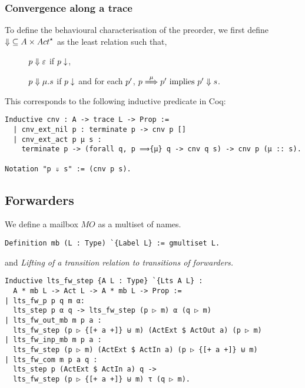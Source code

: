 \subsubsection{Convergence along a trace}

To define the behavioural characterisation of the preorder, we first define
${\cnvalong} \subseteq \States \times \Actfin$ as the least relation such
that,%
\begin{description}
\item[\cnvepsilon] $p \mathrel{\Downarrow} \varepsilon$ if $p \downarrow$,
\item[\cnvmu] $ p \mathrel{\Downarrow} \mu.s $ if $p \downarrow$ and for each $p'$,
$p \mathrel{\overset{\mu} \Longrightarrow} p' \text{ implies } p' \mathrel{\Downarrow} s$.
\end{description}

\noindent
This corresponds to the following inductive predicate in Coq:

\begin{mdframed}
\begin{verbatim}
Inductive cnv : A -> trace L -> Prop :=
  | cnv_ext_nil p : terminate p -> cnv p []
  | cnv_ext_act p μ s :
    terminate p -> (forall q, p ⟹{μ} q -> cnv q s) -> cnv p (μ :: s).

Notation "p ⇓ s" := (cnv p s).
\end{verbatim}
\end{mdframed}


\subsection{Forwarders}

We define a mailbox $MO$ as a multiset of names.

\begin{mdframed}
\begin{verbatim}
Definition mb (L : Type) `{Label L} := gmultiset L.
\end{verbatim}
\end{mdframed}

\noindent
{} and \emph{
Lifting of a transition relation to transitions of forwarders.
}

\begin{mdframed}
\begin{verbatim}
Inductive lts_fw_step {A L : Type} `{Lts A L} :
  A * mb L -> Act L -> A * mb L -> Prop :=
| lts_fw_p p q m α:
  lts_step p α q -> lts_fw_step (p ▷ m) α (q ▷ m)
| lts_fw_out_mb m p a :
  lts_fw_step (p ▷ {[+ a +]} ⊎ m) (ActExt $ ActOut a) (p ▷ m)
| lts_fw_inp_mb m p a :
  lts_fw_step (p ▷ m) (ActExt $ ActIn a) (p ▷ {[+ a +]} ⊎ m)
| lts_fw_com m p a q :
  lts_step p (ActExt $ ActIn a) q ->
  lts_fw_step (p ▷ {[+ a +]} ⊎ m) τ (q ▷ m).
\end{verbatim}
\end{mdframed}

